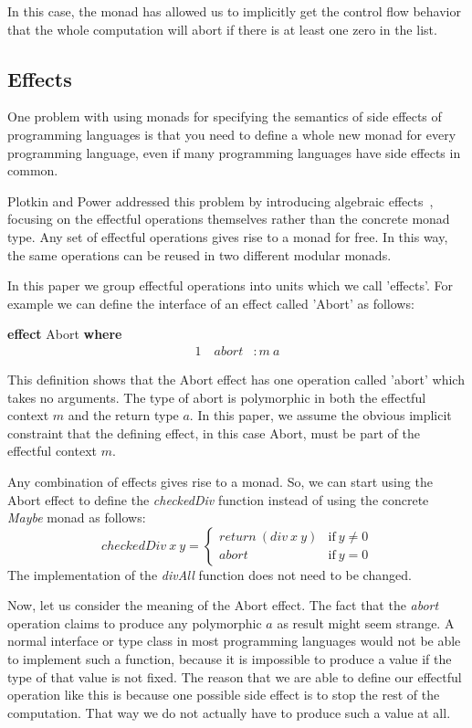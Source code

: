 \documentclass[a4paper,UKenglish,cleveref, autoref, thm-restate]{oasics-v2021}
\begin{document}
In this case, the monad has allowed us to implicitly get the control flow behavior that the whole computation will abort if there is at least one zero in the list.

\subsection{Effects}

One problem with using monads for specifying the semantics of side effects of programming languages is that you need to define a whole new monad for every programming language, even if many programming languages have side effects in common.

Plotkin and Power addressed this problem by introducing algebraic effects~\cite{10.1007/3-540-45315-6_1}, focusing on the effectful operations themselves rather than the concrete monad type.
Any set of effectful operations gives rise to a monad for free.
In this way, the same operations can be reused in two different modular monads.

In this paper we group effectful operations into units which we call 'effects'. For example we can define the interface of an effect called 'Abort' as follows:

\vspace{1em}
\textbf{effect} Abort \textbf{where}
\vspace{-1em}
\begin{alignat*}{1}
  \quad\mathit{abort} & :  m~a
\end{alignat*}

This definition shows that the Abort effect has one operation called 'abort' which takes no arguments.
The type of abort is polymorphic in both the effectful context $m$ and the return type $a$.
In this paper, we assume the obvious implicit constraint that the defining effect, in this case Abort, must be part of the effectful context $m$.

Any combination of effects gives rise to a monad.
So, we can start using the Abort effect to define the \textit{checkedDiv} function instead of using the concrete \textit{Maybe} monad as follows:
\[
  \mathit{checkedDiv}~x~y = \begin{cases} 
    \mathit{return}~(\mathit{div}~x~y) & \text{if}~y \neq 0 \\
    \mathit{abort} & \text{if}~y = 0
  \end{cases}
\]
The implementation of the \textit{divAll} function does not need to be changed.

Now, let us consider the meaning of the Abort effect.
The fact that the \textit{abort} operation claims to produce any polymorphic $a$ as result might seem strange.
A normal interface or type class in most programming languages would not be able to implement such a function, because it is impossible to produce a value if the type of that value is not fixed.
The reason that we are able to define our effectful operation like this is because one possible side effect is to stop the rest of the computation.
That way we do not actually have to produce such a value at all.
\end{document}
